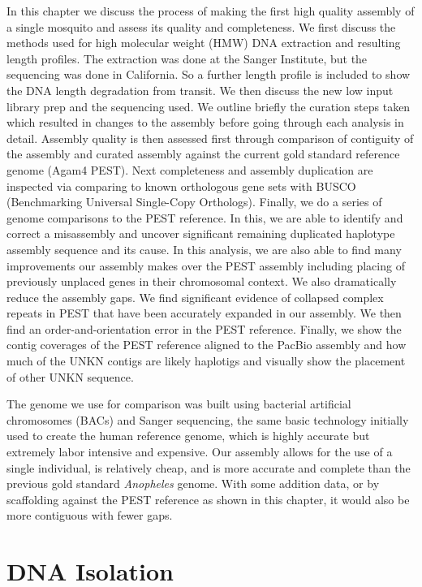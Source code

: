 \par{
In this chapter we discuss the process of making the first high quality assembly of a single mosquito and assess its quality and completeness. We first discuss the methods used for high molecular weight (HMW) DNA extraction and resulting length profiles. The extraction was done at the Sanger Institute, but the sequencing was done in California. So a further length profile is included to show the DNA length degradation from transit. We then discuss the new low input library prep and the sequencing used. We outline briefly the curation steps taken which resulted in changes to the assembly before going through each analysis in detail. Assembly quality is then assessed first through comparison of contiguity of the assembly and curated assembly against the current gold standard reference genome (Agam4 PEST). Next completeness and assembly duplication are inspected via comparing to known orthologous gene sets with BUSCO (Benchmarking Universal Single-Copy Orthologs). Finally, we do a series of genome comparisons to the PEST reference. In this, we are able to identify and correct a misassembly and uncover significant remaining duplicated haplotype assembly sequence and its cause. In this analysis, we are also able to find many improvements our assembly makes over the PEST assembly including placing of previously unplaced genes in their chromosomal context. We also dramatically reduce the assembly gaps. We find significant evidence of collapsed complex repeats in PEST that have been accurately expanded in our assembly. We then find an order-and-orientation error in the PEST reference. Finally, we show the contig coverages of the PEST reference aligned to the PacBio assembly and how much of the UNKN contigs are likely haplotigs and visually show the placement of other UNKN sequence.
}

\par{
The genome we use for comparison was built using bacterial artificial chromosomes (BACs) and Sanger sequencing, the same basic technology initially used to create the human reference genome, which is highly accurate but extremely labor intensive and expensive. Our assembly allows for the use of a single individual, is relatively cheap, and is more accurate and complete than the previous gold standard \textit{Anopheles} genome. With some addition data, or by scaffolding against the PEST reference as shown in this chapter, it would also be more contiguous with fewer gaps.
}

\section{DNA Isolation}

